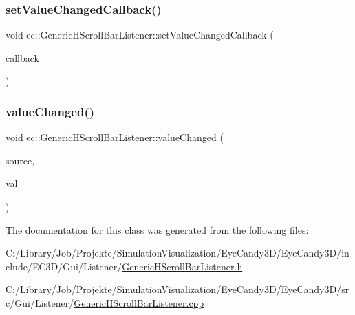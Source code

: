 \mbox{\label{classec_1_1_generic_h_scroll_bar_listener_a6b33c23b467c4a006acca5e134fc9f12}} 
\subsubsection{\texorpdfstring{set\+Value\+Changed\+Callback()}{setValueChangedCallback()}}
{\footnotesize\ttfamily void ec\+::\+Generic\+H\+Scroll\+Bar\+Listener\+::set\+Value\+Changed\+Callback (\begin{DoxyParamCaption}\item[{const \mbox{\hyperlink{classec_1_1_generic_h_scroll_bar_listener_ad02a375c4835a99a41bcd97b6a408637}{Value\+Changed\+\_\+\+Callback}} \&}]{callback }\end{DoxyParamCaption})}

\mbox{\label{classec_1_1_generic_h_scroll_bar_listener_a7c55d42a9623801361988a153d5d2d6d}} 
\subsubsection{\texorpdfstring{value\+Changed()}{valueChanged()}}
{\footnotesize\ttfamily void ec\+::\+Generic\+H\+Scroll\+Bar\+Listener\+::value\+Changed (\begin{DoxyParamCaption}\item[{agui\+::\+H\+Scroll\+Bar $\ast$}]{source,  }\item[{int}]{val }\end{DoxyParamCaption})\hspace{0.3cm}{\ttfamily [override]}}



The documentation for this class was generated from the following files\+:\begin{DoxyCompactItemize}
\item 
C\+:/\+Library/\+Job/\+Projekte/\+Simulation\+Visualization/\+Eye\+Candy3\+D/\+Eye\+Candy3\+D/include/\+E\+C3\+D/\+Gui/\+Listener/\mbox{\hyperlink{_generic_h_scroll_bar_listener_8h}{Generic\+H\+Scroll\+Bar\+Listener.\+h}}\item 
C\+:/\+Library/\+Job/\+Projekte/\+Simulation\+Visualization/\+Eye\+Candy3\+D/\+Eye\+Candy3\+D/src/\+Gui/\+Listener/\mbox{\hyperlink{_generic_h_scroll_bar_listener_8cpp}{Generic\+H\+Scroll\+Bar\+Listener.\+cpp}}\end{DoxyCompactItemize}
